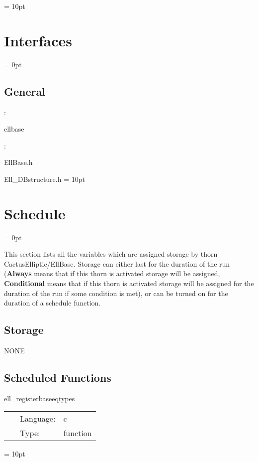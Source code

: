 \documentclass{article}
\begin{document}
\vspace{0.5cm}\parskip = 10pt 

\section{Interfaces} 


\parskip = 0pt

\vspace{3mm} \subsection*{General}

: 

ellbase
\vspace{2mm}

\vspace{5mm}

: 



EllBase.h

Ell\_DBstructure.h
\vspace{2mm}\parskip = 10pt 

\section{Schedule} 


\parskip = 0pt


\noindent This section lists all the variables which are assigned storage by thorn CactusElliptic/EllBase.  Storage can either last for the duration of the run ({\bf Always} means that if this thorn is activated storage will be assigned, {\bf Conditional} means that if this thorn is activated storage will be assigned for the duration of the run if some condition is met), or can be turned on for the duration of a schedule function.


\subsection*{Storage}NONE
\subsection*{Scheduled Functions}
\vspace{5mm}


\hspace{5mm} ell\_registerbaseeqtypes 

\hspace{5mm}{\it register the standard elliptic classes } 


\hspace{5mm}

 \begin{tabular*}{160mm}{cll} 
~ & Language:  & c \\ 
~ & Type:  & function \\ 
\end{tabular*} 



\vspace{5mm}\parskip = 10pt 
\end{document}
